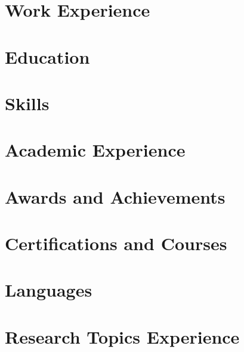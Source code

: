 \documentclass[10pt,letterpaper]{article} %
\begin{document}
\pagestyle{empty} %



\section*{Work Experience}


\section*{Education}


\section*{Skills}


\section*{Academic Experience}


\section*{Awards and Achievements}


\section*{Certifications and Courses}


\section*{Languages}


\section*{Research Topics Experience}


\end{document}
